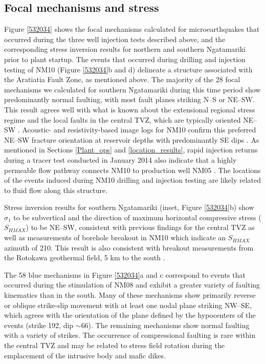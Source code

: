\subsection{Focal mechanisms and stress}
Figure \ref{532034} shows the focal mechanisms calculated for microearthquakes that occurred during the three well injection tests described above, and the corresponding stress inversion results for northern and southern Ngatamariki prior to plant startup. The events that occurred during drilling and injection testing of NM10 (Figure \ref{532034}b and d) delineate a structure associated with the Aratiatia Fault Zone, as mentioned above. The majority of the 28 focal mechanisms we calculated for southern Ngatamariki during this time period show predominantly normal faulting, with most fault planes striking N--S or NE--SW. This result agrees well with what is known about the extensional regional stress regime and the local faults in the central TVZ, which are typically oriented NE--SW \citep{Massiot_2015}. Acoustic- and resistivity-based image logs for NM10 confirm this preferred NE--SW fracture orientation at reservoir depths with predominantly SE dips \citep{nm10_report}. As mentioned in Sections \ref{Plant_ops} and \ref{location_results}, rapid injection returns during a tracer test conducted in January 2014 also indicate that a highly permeable flow pathway connects NM10 to production well NM05 \citep{buscarlet_2015}. The locations of the events induced during NM10 drilling and injection testing are likely related to fluid flow along this structure.

Stress inversion results for southern Ngatamariki (inset, Figure \ref{532034}b) show $\sigma_1$ to be subvertical and the direction of maximum horizontal compressive stress ($S_{HMAX}$) to be NE--SW, consistent with previous findings for the central TVZ \citep{Townend_2012} as well as measurements of borehole breakout in NM10 which indicate an $S_{HMAX}$ azimuth of 210\textdegree \citep{nm10_report}. This result is also consistent with breakout measurements from the Rotokawa geothermal field, 5 km to the south \citep{McNamara_2015}.

The 58 blue mechanisms in Figure \ref{532034}a and c correspond to events that occurred during the \gls{stimulation} of NM08 and exhibit a greater variety of faulting kinematics than in the south. Many of these mechanisms show primarily reverse or oblique strike-slip movement with at least one nodal plane striking NW--SE, which agrees with the orientation of the plane defined by the hypocenters of the events (strike 192\textdegree, dip $\sim$66\textdegree). The remaining mechanisms show normal faulting with a variety of strikes. The occurrence of compressional faulting is rare within the central TVZ and may be related to stress field rotation during the emplacement of the intrusive body and mafic dikes.

